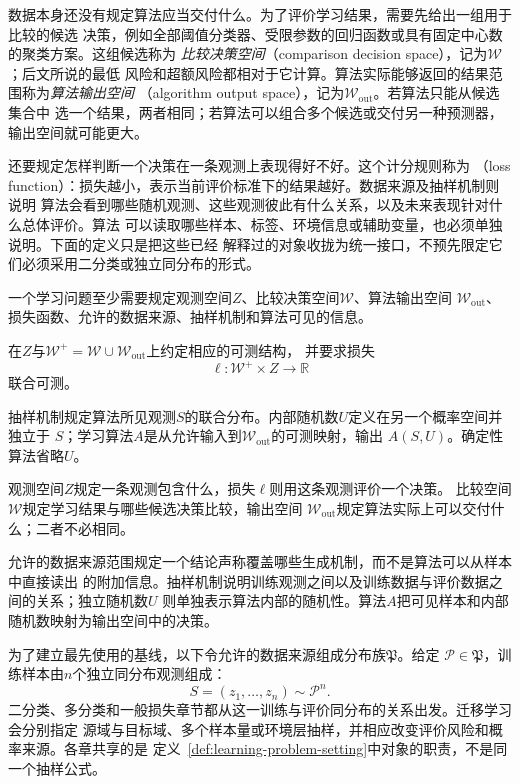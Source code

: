 数据本身还没有规定算法应当交付什么。为了评价学习结果，需要先给出一组用于比较的候选
决策，例如全部阈值分类器、受限参数的回归函数或具有固定中心数的聚类方案。这组候选称为
\emph{比较决策空间}（comparison decision space），记为$\mathcal W$；后文所说的最低
风险和超额风险都相对于它计算。算法实际能够返回的结果范围称为\emph{算法输出空间}
（algorithm output space），记为$\mathcal W_{\mathrm{out}}$。若算法只能从候选集合中
选一个结果，两者相同；若算法可以组合多个候选或交付另一种预测器，输出空间就可能更大。

还要规定怎样判断一个决策在一条观测上表现得好不好。这个计分规则称为
（loss function）：损失越小，表示当前评价标准下的结果越好。数据来源及抽样机制则说明
算法会看到哪些随机观测、这些观测彼此有什么关系，以及未来表现针对什么总体评价。算法
可以读取哪些样本、标签、环境信息或辅助变量，也必须单独说明。下面的定义只是把这些已经
解释过的对象收拢为统一接口，不预先限定它们必须采用二分类或独立同分布的形式。

\begin{definition}[学习问题的形式设定]
\label{def:learning-problem-setting}
一个学习问题至少需要规定观测空间$Z$、比较决策空间$\mathcal W$、算法输出空间
$\mathcal W_{\mathrm{out}}$、损失函数、允许的数据来源、抽样机制和算法可见的信息。

在$Z$与$\mathcal W^+=\mathcal W\cup\mathcal W_{\mathrm{out}}$上约定相应的可测结构，
并要求损失
\[
 \ell:\mathcal W^+\times Z\to\mathbb R
\]
联合可测。

抽样机制规定算法所见观测$S$的联合分布。内部随机数$U$定义在另一个概率空间并独立于
$S$；学习算法$A$是从允许输入到$\mathcal W_{\mathrm{out}}$的可测映射，输出
$A(S,U)$。确定性算法省略$U$。
\end{definition}

观测空间$Z$规定一条观测包含什么，损失$\ell$则用这条观测评价一个决策。
比较空间$\mathcal W$规定学习结果与哪些候选决策比较，输出空间
$\mathcal W_{\mathrm{out}}$规定算法实际上可以交付什么；二者不必相同。

允许的数据来源范围规定一个结论声称覆盖哪些生成机制，而不是算法可以从样本中直接读出
的附加信息。抽样机制说明训练观测之间以及训练数据与评价数据之间的关系；独立随机数$U$
则单独表示算法内部的随机性。算法$A$把可见样本和内部随机数映射为输出空间中的决策。

为了建立最先使用的基线，以下令允许的数据来源组成分布族$\mathfrak P$。给定
$\mathcal P\in\mathfrak P$，训练样本由$n$个独立同分布观测组成：
\[
 S=(z_1,\ldots,z_n)\sim\mathcal P^n.
\]
二分类、多分类和一般损失章节都从这一训练与评价同分布的关系出发。迁移学习会分别指定
源域与目标域、多个样本量或环境层抽样，并相应改变评价风险和概率来源。各章共享的是
定义~\ref{def:learning-problem-setting}中对象的职责，不是同一个抽样公式。

